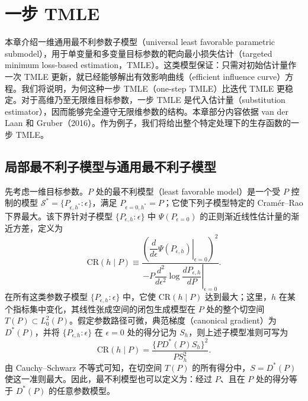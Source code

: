 \chapter{一步 TMLE}
\label{ch:one-step-tmle}

本章介绍一维通用最不利参数子模型（universal least favorable parametric submodel），用于单变量和多变量目标参数的靶向最小损失估计（targeted minimum loss-based estimation，TMLE）。这类模型保证：只需对初始估计量作一次 TMLE 更新，就已经能够解出有效影响曲线（efficient influence curve）方程。我们将说明，为何这种一步 TMLE（one-step TMLE）比迭代 TMLE 更稳定。对于高维乃至无限维目标参数，一步 TMLE 是代入估计量（substitution estimator），因而能够完全遵守无限维参数的结构。本章部分内容依据 van der Laan 和 Gruber（2016）。作为例子，我们将给出整个特定处理下的生存函数的一步 TMLE。

\section{局部最不利子模型与通用最不利子模型}

先考虑一维目标参数。$P$ 处的最不利模型（least favorable model）是一个受 $P$ 控制的模型
$\mathcal S^*=\{P_{\epsilon,h^*}:\epsilon\}$，满足 $P_{\epsilon=0,h^*}=P$；它使下列子模型特定的 Cramér--Rao 下界最大。该下界针对子模型 $\{P_{\epsilon,h}:\epsilon\}$ 中 $\Psi(P_{\epsilon=0})$ 的正则渐近线性估计量的渐近方差，定义为
\[
 \mathrm{CR}(h\mid P)\equiv
 \frac{\left(\left.\dfrac{d}{d\epsilon}\Psi(P_{\epsilon,h})\right|_{\epsilon=0}\right)^2}
 {-\left.P\dfrac{d^2}{d\epsilon^2}\log\dfrac{dP_{\epsilon,h}}{dP}\right|_{\epsilon=0}}.
\]
在所有这类参数子模型 $\{P_{\epsilon,h}:\epsilon\}$ 中，它使 $\mathrm{CR}(h\mid P)$ 达到最大；这里，$h$ 在某个指标集中变化，其线性张成空间的闭包生成模型在 $P$ 处的整个切空间 $T(P)\subset L_0^2(P)$。假定参数路径可微，典范梯度（canonical gradient）为 $D^*(P)$，并将 $\{P_{\epsilon,h}:\epsilon\}$ 在 $\epsilon=0$ 处的得分记为 $S_h$，则上述子模型准则可写为
\[
 \mathrm{CR}(h\mid P)=\frac{\{PD^*(P)S_h\}^2}{PS_h^2}.
\]
由 Cauchy--Schwarz 不等式可知，在切空间 $T(P)$ 的所有得分中，$S=D^*(P)$ 使这一准则最大。因此，最不利模型也可以定义为：经过 $P$、且在 $P$ 处的得分等于 $D^*(P)$ 的任意参数模型。


